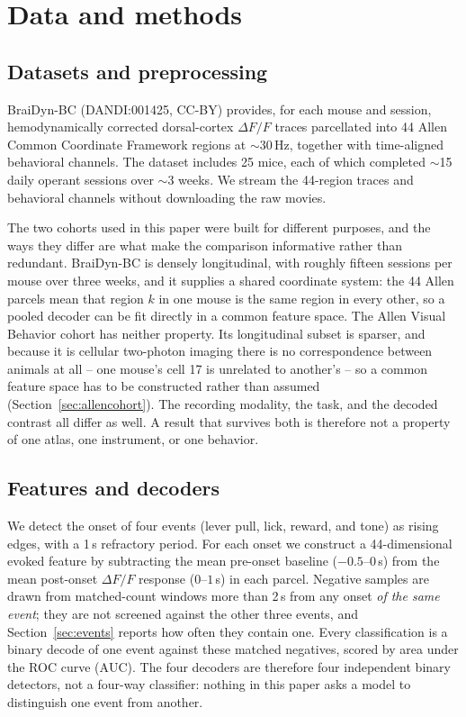 \documentclass{article}
\newcommand{\auc}{\mathrm{AUC}}
\begin{document}
\section{Data and methods}
\subsection{Datasets and preprocessing}
BraiDyn-BC \citep{kondo2025} (DANDI:001425, CC-BY) provides, for each mouse and
session, hemodynamically corrected dorsal-cortex $\Delta F/F$ traces parcellated into 44 Allen Common
Coordinate Framework regions at $\sim$30\,Hz, together with time-aligned behavioral channels. The
dataset includes 25 mice, each of which completed $\sim$15 daily operant sessions over $\sim$3 weeks.
We stream the 44-region traces and behavioral channels without downloading the raw movies.

The two cohorts used in this paper were built for different purposes, and the ways they differ are
what make the comparison informative rather than redundant. BraiDyn-BC is densely longitudinal, with
roughly fifteen sessions per mouse over three weeks, and it supplies a shared coordinate system: the
44 Allen parcels mean that region $k$ in one mouse is the same region in every other, so a pooled
decoder can be fit directly in a common feature space. The Allen Visual Behavior cohort has neither
property. Its longitudinal subset is sparser, and because it is cellular two-photon imaging there is
no correspondence between animals at all -- one mouse's cell 17 is unrelated to another's -- so a
common feature space has to be constructed rather than assumed (Section~\ref{sec:allencohort}). The
recording modality, the task, and the decoded contrast all differ as well. A result that survives
both is therefore not a property of one atlas, one instrument, or one behavior.

\subsection{Features and decoders}
We detect the onset of four events (lever pull, lick, reward, and
tone) as rising edges, with a 1\,s refractory period. For each onset we construct a 44-dimensional
evoked feature by subtracting the mean pre-onset baseline ($-0.5$--$0$\,s) from the mean post-onset
$\Delta F/F$ response ($0$--$1$\,s) in each parcel. Negative samples are drawn from matched-count
windows more than 2\,s from any onset \emph{of the same event}; they are not screened against the
other three events, and Section~\ref{sec:events} reports how often they contain one. Every
classification is a binary decode of one event against these matched negatives, scored by area under
the ROC curve ($\auc$). The four decoders are therefore four independent binary detectors, not a
four-way classifier: nothing in this paper asks a model to distinguish one event from another.
\end{document}
